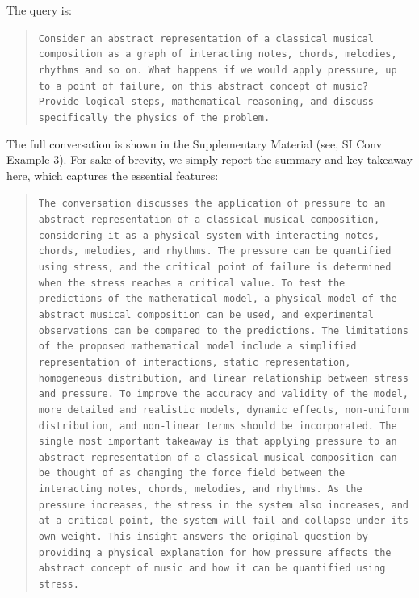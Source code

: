 The query is:
\begin{quote}
\small\texttt{Consider an abstract representation of a classical musical composition as a graph of
interacting notes, chords, melodies, rhythms and so on.
\newline\newline
What happens if we would apply pressure, up to a point of failure, on this abstract concept of music?
\newline\newline
Provide logical steps, mathematical reasoning, and discuss specifically the physics of the problem.}
\end{quote}
The full conversation is shown in the Supplementary Material (see, SI Conv Example 3). For sake of brevity, we simply report the summary and key takeaway here, which captures the essential features:
\begin{quote}
\small\texttt{The conversation discusses the application of pressure to an abstract representation of a classical musical composition,
considering it as a physical system with interacting notes, chords, melodies, and rhythms. The pressure can be
quantified using stress, and the critical point of failure is determined when the stress reaches a critical value. To test
the predictions of the mathematical model, a physical model of the abstract musical composition can be used, and
experimental observations can be compared to the predictions. The limitations of the proposed mathematical model
include a simplified representation of interactions, static representation, homogeneous distribution, and linear
relationship between stress and pressure. To improve the accuracy and validity of the model, more detailed and
realistic models, dynamic effects, non-uniform distribution, and non-linear terms should be incorporated. 
\newline\newline
[...]
\newline\newline
The single most important takeaway is that applying pressure to an abstract representation of a classical
musical composition can be thought of as changing the force field between the interacting notes, chords,
melodies, and rhythms. As the pressure increases, the stress in the system also increases, and at a critical
point, the system will fail and collapse under its own weight. This insight answers the original question by
providing a physical explanation for how pressure affects the abstract concept of music and how it can be
quantified using stress.}
\end{quote}

